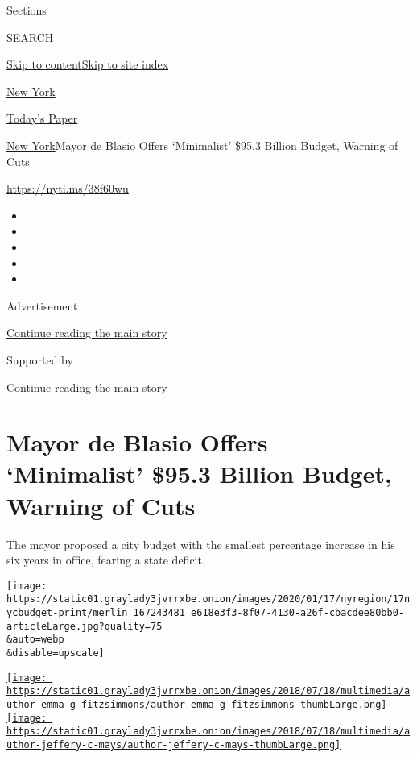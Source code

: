 Sections

SEARCH

\protect\hyperlink{site-content}{Skip to
content}\protect\hyperlink{site-index}{Skip to site index}

\href{https://www.nytimes3xbfgragh.onion/section/nyregion}{New York}

\href{https://myaccount.nytimes3xbfgragh.onion/auth/login?response_type=cookie\&client_id=vi}{}

\href{https://www.nytimes3xbfgragh.onion/section/todayspaper}{Today's
Paper}

\href{/section/nyregion}{New York}\textbar{}Mayor de Blasio Offers
`Minimalist' \$95.3 Billion Budget, Warning of Cuts

\url{https://nyti.ms/38f60wu}

\begin{itemize}
\item
\item
\item
\item
\item
\end{itemize}

Advertisement

\protect\hyperlink{after-top}{Continue reading the main story}

Supported by

\protect\hyperlink{after-sponsor}{Continue reading the main story}

\hypertarget{mayor-de-blasio-offers-minimalist-953-billion-budget-warning-of-cuts}{%
\section{Mayor de Blasio Offers `Minimalist' \$95.3 Billion Budget,
Warning of
Cuts}\label{mayor-de-blasio-offers-minimalist-953-billion-budget-warning-of-cuts}}

The mayor proposed a city budget with the smallest percentage increase
in his six years in office, fearing a state deficit.

\texttt{[image: https://static01.graylady3jvrrxbe.onion/images/2020/01/17/nyregion/17nycbudget-print/merlin\_167243481\_e618e3f3-8f07-4130-a26f-cbacdee80bb0-articleLarge.jpg?quality=75\\\&auto=webp\\\&disable=upscale]}

\href{https://www.nytimes3xbfgragh.onion/by/emma-g-fitzsimmons}{\texttt{[image: https://static01.graylady3jvrrxbe.onion/images/2018/07/18/multimedia/author-emma-g-fitzsimmons/author-emma-g-fitzsimmons-thumbLarge.png]}}\href{https://www.nytimes3xbfgragh.onion/by/jeffery-c-mays}{\texttt{[image: https://static01.graylady3jvrrxbe.onion/images/2018/07/18/multimedia/author-jeffery-c-mays/author-jeffery-c-mays-thumbLarge.png]}}

